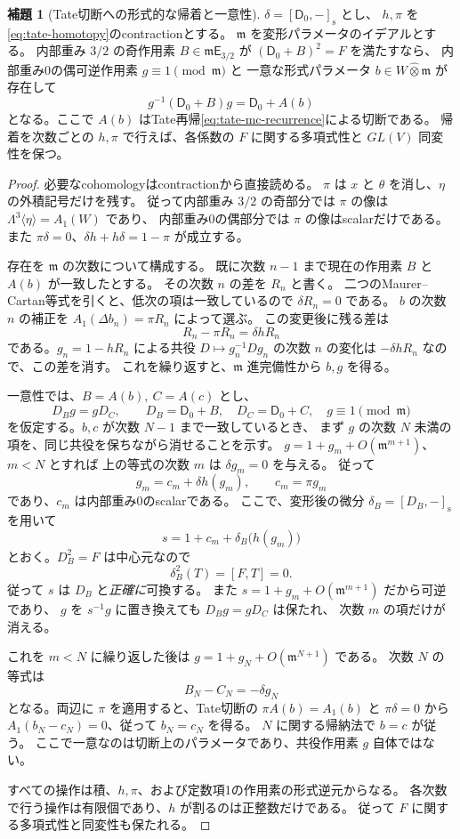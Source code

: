 \documentclass[a4paper,11pt]{ltjsarticle}
\theoremstyle{definition}
\newtheorem{lemma}[theorem]{補題}
\begin{document}
\begin{lemma}[Tate切断への形式的な帰着と一意性]
\label{lem:v12-marked-tate-slice}
$\delta=[\mathsf D_0,-]_{\mathrm s}$ とし、
$h,\pi$ を\eqref{eq:tate-homotopy}のcontractionとする。
$\mathfrak m$ を変形パラメータのイデアルとする。
内部重み $3/2$ の奇作用素 $B\in\mathfrak m\mathsf E_{3/2}$ が
$(\mathsf D_0+B)^2=F$ を満たすなら、
内部重み0の偶可逆作用素 $g\equiv1\pmod{\mathfrak m}$ と
一意な形式パラメータ $b\in W\widehat\otimes\mathfrak m$ が存在して
\[
 g^{-1}(\mathsf D_0+B)g=\mathsf D_0+A(b)
\]
となる。ここで $A(b)$ はTate再帰\eqref{eq:tate-mc-recurrence}による切断である。
帰着を次数ごとの $h,\pi$ で行えば、各係数の $F$ に関する多項式性と
$GL(V)$ 同変性を保つ。
\end{lemma}
\begin{proof}
必要なcohomologyはcontractionから直接読める。
$\pi$ は $x$ と $\theta$ を消し、$\eta$ の外積記号だけを残す。
従って内部重み $3/2$ の奇部分では $\pi$ の像は
$\Lambda^3\langle\eta\rangle=A_1(W)$ であり、
内部重み0の偶部分では $\pi$ の像はscalarだけである。
また $\pi\delta=0$、$\delta h+h\delta=1-\pi$ が成立する。

存在を $\mathfrak m$ の次数について構成する。
既に次数 $n-1$ まで現在の作用素 $B$ と $A(b)$ が一致したとする。
その次数 $n$ の差を $R_n$ と書く。
二つのMaurer--Cartan等式を引くと、低次の項は一致しているので
$\delta R_n=0$ である。
$b$ の次数 $n$ の補正を
$A_1(\Delta b_n)=\pi R_n$ によって選ぶ。
この変更後に残る差は
\[
 R_n-\pi R_n=\delta hR_n
\]
である。$g_n=1-hR_n$ による共役
$D\mapsto g_n^{-1}Dg_n$ の次数 $n$ の変化は
$-\delta hR_n$ なので、この差を消す。
これを繰り返すと、$\mathfrak m$ 進完備性から $b,g$ を得る。

一意性では、$B=A(b),\ C=A(c)$ とし、
\[
 D_Bg=gD_C,\qquad D_B=\mathsf D_0+B,\quad
 D_C=\mathsf D_0+C,\quad g\equiv1\pmod{\mathfrak m}
\]
を仮定する。$b,c$ が次数 $N-1$ まで一致しているとき、
まず $g$ の次数 $N$ 未満の項を、同じ共役を保ちながら消せることを示す。
$g=1+g_m+O(\mathfrak m^{m+1})$、$m<N$ とすれば
上の等式の次数 $m$ は $\delta g_m=0$ を与える。
従って
\[
 g_m=c_m+\delta h(g_m),\qquad c_m=\pi g_m
\]
であり、$c_m$ は内部重み0のscalarである。
ここで、変形後の微分 $\delta_B=[D_B,-]_{\mathrm s}$ を用いて
\[
 s=1+c_m+\delta_B\bigl(h(g_m)\bigr)
\]
とおく。$D_B^2=F$ は中心元なので
\[
 \delta_B^2(T)=[F,T]=0.
\]
従って $s$ は $D_B$ と\emph{正確に}可換する。
また $s=1+g_m+O(\mathfrak m^{m+1})$ だから可逆であり、
$g$ を $s^{-1}g$ に置き換えても $D_Bg=gD_C$ は保たれ、
次数 $m$ の項だけが消える。

これを $m<N$ に繰り返した後は $g=1+g_N+O(\mathfrak m^{N+1})$ である。
次数 $N$ の等式は
\[
 B_N-C_N=-\delta g_N
\]
となる。両辺に $\pi$ を適用すると、Tate切断の
$\pi A(b)=A_1(b)$ と $\pi\delta=0$ から
$A_1(b_N-c_N)=0$、従って $b_N=c_N$ を得る。
$N$ に関する帰納法で $b=c$ が従う。
ここで一意なのは切断上のパラメータであり、共役作用素 $g$ 自体ではない。

すべての操作は積、$h,\pi$、および定数項1の作用素の形式逆元からなる。
各次数で行う操作は有限個であり、$h$ が割るのは正整数だけである。
従って $F$ に関する多項式性と同変性も保たれる。
\end{proof}
\end{document}
